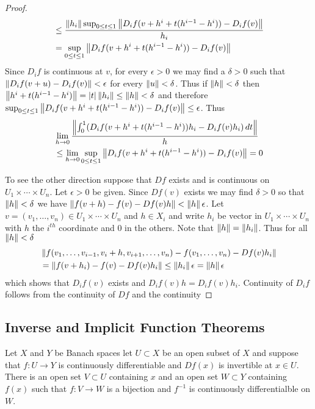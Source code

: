 \begin{proof}
\begin{align*}
&\leq \frac{\left \lVert h_i \right \rVert \sup_{0 \leq t \leq 1} \left \lVert  D_i f(v+h^i + t(h^{i-1}-h^i)) - D_i f (v)  \right \rVert}{h_i} \\
&=  \sup_{0 \leq t \leq 1} \left \lVert  D_i f(v+h^i + t(h^{i-1}-h^i)) - D_i f (v)  \right \rVert\\
\end{align*}
Since $D_i f$ is continuous at $v$, for every $\epsilon > 0$ we may find a $\delta > 0$ such that $\left \lVert D_i f(v + u) - D_i f(v) \right \rVert < \epsilon$ for every $\left \lVert u \right \rVert < \delta$.  Thus if $\left \lVert h \right \rVert < \delta$ then $\left \lVert h^i + t(h^{i-1}-h^i) \right \rVert = \left \vert t \right \vert \left \lVert h_i \right \rVert \leq \left \lVert h \right \rVert < \delta$ and therefore $\sup_{0 \leq t \leq 1} \left \lVert  D_i f(v+h^i + t(h^{i-1}-h^i)) - D_i f (v)  \right \rVert\leq \epsilon$.  Thus 
\begin{align*}
&\lim_{h \to 0} \frac{\left \lVert \int_0^1 (D_i f(v+h^i + t(h^{i-1}-h^i)) h_i - D_i f (v) h_i )\, dt \right \rVert}{h} \\
&\leq \lim_{h \to 0} \sup_{0 \leq t \leq 1} \left \lVert  D_i f(v+h^i + t(h^{i-1}-h^i)) - D_i f (v)  \right \rVert= 0
\end{align*}

To see the other direction suppose that $Df$ exists and is continuous on $U_1 \times \dotsb \times U_n$.  Let $\epsilon > 0$ be given.  Since $Df(v)$ exists we may find $\delta > 0$ so that $\left \lVert h \right \rVert < \delta$ we have $\left \lVert f(v+h) - f(v) - Df(v) h \right \rVert < \left \lVert h \right \rVert \epsilon$.   Let $v=(v_1, \dotsc, v_n) \in U_1 \times \dotsb \times U_n$ and $h \in X_i$ and write $h_i$ be vector in $U_1 \times \dotsb \times U_n$ with $h$ the $i^{th}$ coordinate and $0$ in the others.   Note that $\left \lVert h \right \rVert = \left \lVert h_i \right \rVert$.  Thus for all $\left \lVert h \right \rVert < \delta$
\begin{align*}
&\left \lVert f(v_1, \dotsc, v_{i-1}, v_i+h, v_{i+1}, \dotsc, v_n) - f(v_1, \dotsc, v_n) - Df(v) h_i \right \rVert \\
&= \left \lVert f(v + h_i) - f(v) - Df(v) h_i \right \rVert \leq \left \lVert h_i \right \rVert \epsilon = \left \lVert h \right \rVert \epsilon
\end{align*}
which shows that $D_i f(v)$ exists and $D_i f(v) h = D_i f(v) h_i$.  Continuity of $D_i f$ follows from the continuity of $Df$ and the continuity 
\end{proof}

\subsection{Inverse and Implicit Function Theorems}

\begin{thm}\label{InverseFunctionTheoremBanachSpaces}Let $X$ and $Y$ be Banach spaces let $U \subset X$ be an
  open subset of $X$ and suppose that $f : U \to Y$ is continuously
  differentiable and $Df(x)$ is invertible at $x \in U$.  There is an
  open set $V \subset U$ containing $x$ and an open set $W \subset Y$
  containing
  $f(x)$ such that $f : V \to W$ is a bijection and $f^{-1}$ is
  continuously differentialble on $W$.
\end{thm}

